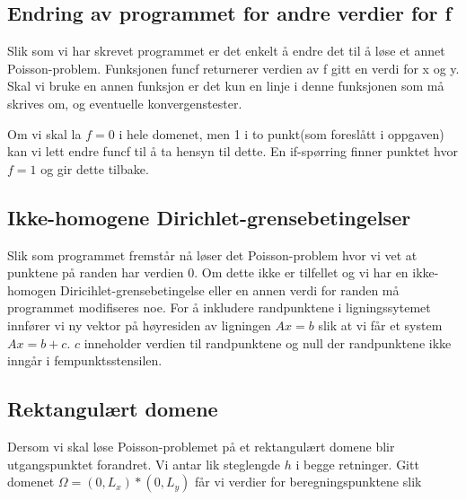 \documentclass[11pt,norsk,a4paper]{article}
\begin{document}
\subsection{Endring av programmet for andre verdier for f}
Slik som vi har skrevet programmet er det enkelt å endre det til å løse et annet Poisson-problem. Funksjonen funcf returnerer verdien av f gitt en verdi for x og y. Skal vi bruke en annen funksjon er det kun en linje i denne funksjonen som må skrives om, og eventuelle konvergenstester.

Om vi skal la $f=0$ i hele domenet, men 1 i to punkt(som foreslått i oppgaven) kan vi lett endre funcf til å ta hensyn til dette. En if-spørring finner punktet hvor $f=1$ og gir dette tilbake.

\subsection{Ikke-homogene Dirichlet-grensebetingelser}
Slik som programmet fremstår nå løser det Poisson-problem hvor vi vet at punktene på randen har verdien 0. Om dette ikke er tilfellet og vi har en ikke-homogen Diricihlet-grensebetingelse eller en annen verdi for randen må programmet modifiseres noe. For å inkludere randpunktene i ligningssytemet innfører vi ny vektor på høyresiden av ligningen $Ax=b$ slik at vi får et system $Ax=b+c$. $c$ inneholder verdien til randpunktene og null der randpunktene ikke inngår i fempunktsstensilen. 

\subsection{Rektangulært domene}
Dersom vi skal løse Poisson-problemet på et rektangulært domene blir utgangspunktet forandret. Vi antar lik steglengde $h$ i begge retninger. Gitt domenet $\Omega = (0,L_x)*(0,L_y)$ får vi verdier for beregningspunktene slik
\end{document}
